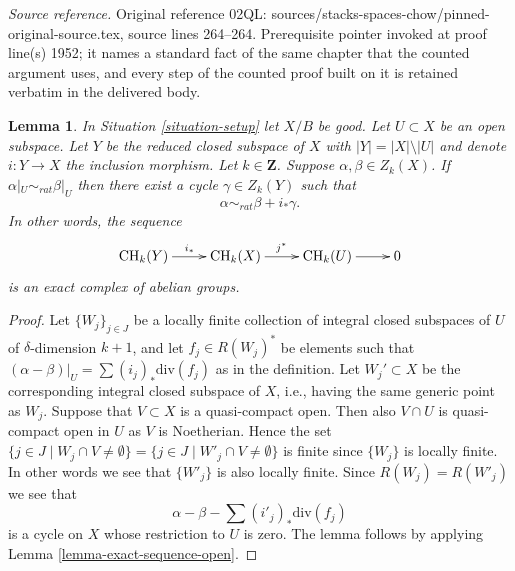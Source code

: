 \documentclass[10pt,a4paper]{amsart}
\theoremstyle{plain}
\newtheorem{lemma}[subsection]{Lemma}
\theoremstyle{definition}
\theoremstyle{remark}
\numberwithin{equation}{subsection}
\def\CH{\mathop{\mathrm{CH}}\nolimits}
\begin{document}
\noindent\textit{Source reference.} Original reference 02QL: sources/stacks-spaces-chow/pinned-original-source.tex, source lines 264--264. Prerequisite pointer invoked at proof line(s) 1952; it names a standard fact of the same chapter that the counted argument uses, and every step of the counted proof built on it is retained verbatim in the delivered body.\par\medskip
\begin{lemma}
\label{lemma-restrict-to-open}
In Situation \ref{situation-setup} let $X/B$ be good.
Let $U \subset X$ be an open subspace. Let $Y$ be the
reduced closed subspace of $X$ with $|Y| = |X| \setminus |U|$
and denote $i : Y \to X$ the inclusion morphism. Let $k \in \mathbf{Z}$.
Suppose $\alpha, \beta \in Z_k(X)$. If $\alpha|_U \sim_{rat} \beta|_U$
then there exist a cycle $\gamma \in Z_k(Y)$ such that
$$
\alpha \sim_{rat} \beta + i_*\gamma.
$$
In other words, the sequence
$$
\xymatrix{
\CH_k(Y) \ar[r]^{i_*} & \CH_k(X) \ar[r]^{j^*} & \CH_k(U) \ar[r] & 0
}
$$
is an exact complex of abelian groups.
\end{lemma}

\begin{proof}
Let $\{W_j\}_{j \in J}$ be a locally finite collection of integral closed
subspaces of $U$ of $\delta$-dimension $k + 1$, and let $f_j \in R(W_j)^*$
be elements such that $(\alpha - \beta)|_U = \sum (i_j)_*\text{div}(f_j)$
as in the definition. Let $W_j' \subset X$ be the corresponding integral
closed subspace of $X$, i.e., having the same generic point as $W_j$.
Suppose that $V \subset X$ is a quasi-compact open.
Then also $V \cap U$ is quasi-compact open in $U$ as $V$ is Noetherian.
Hence the set $\{j \in J \mid W_j \cap V \not = \emptyset\}
= \{j \in J \mid W'_j \cap V \not = \emptyset\}$
is finite since $\{W_j\}$ is locally finite. In other words we see that
$\{W'_j\}$ is also locally finite. Since $R(W_j) = R(W'_j)$ we see
that
$$
\alpha - \beta - \sum (i'_j)_*\text{div}(f_j)
$$
is a cycle on $X$ whose restriction to $U$ is zero.
The lemma follows by applying Lemma \ref{lemma-exact-sequence-open}.
\end{proof}
\end{document}
